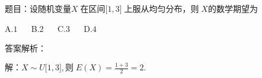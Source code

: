 
题目：$\mathrm{设随机变量}X\;\mathrm{在区间}\lbrack1,3\rbrack\;\mathrm{上服从均匀分布}，则\;X\mathrm{的数学期望为}$

A.$1$ $\quad$ B.$2$ $\quad$ C.$3$ $\quad$ D.$4$

答案解析：

$解：X\sim U\lbrack1,3\rbrack,则\;E(X)=\frac{1+3}2=2.$